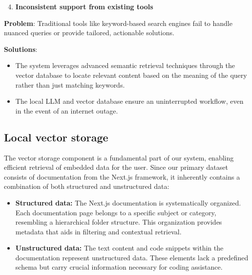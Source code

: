 \begin{enumerate}
  \setcounter{enumi}{3}
  \item \textbf{Inconsistent support from existing tools}
\end{enumerate}

\textbf{Problem}: Traditional tools like keyword-based search engines fail to handle nuanced queries or provide tailored, actionable solutions.
\vspace{2mm}

\textbf{Solutions}:
\begin{itemize}
  \item The system leverages advanced semantic retrieval techniques through the vector database to locate relevant content based on the meaning of the query rather than just matching keywords.
  \item The local LLM and vector database ensure an uninterrupted workflow, even in the event of an internet outage.
\end{itemize}

\subsection{Local vector storage}

The vector storage component is a fundamental part of our system, enabling efficient retrieval of embedded data for the user. Since our primary dataset consists of documentation from the Next.js framework, it inherently contains a combination of both structured and unstructured data:

\begin{itemize}
    \item \textbf{Structured data:} The Next.js documentation is systematically organized. Each documentation page belongs to a specific subject or category, resembling a hierarchical folder structure. This organization provides metadata that aids in filtering and contextual retrieval.
    \item \textbf{Unstructured data:} The text content and code snippets within the documentation represent unstructured data. These elements lack a predefined schema but carry crucial information necessary for coding assistance.
\end{itemize}

